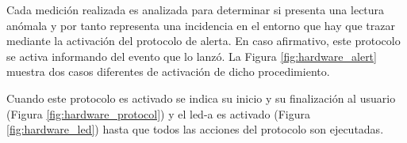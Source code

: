 \documentclass[12pt,a4paper, twoside]{report}
\begin{document}
	Cada medición realizada es analizada para determinar si presenta una lectura anómala y por tanto representa una incidencia en el entorno que hay que trazar mediante la activación del protocolo de alerta. En caso afirmativo, este protocolo se activa informando del evento que lo lanzó. La Figura \ref{fig:hardware_alert} muestra dos casos diferentes de activación de dicho procedimiento.
	
	
	Cuando este protocolo es activado se indica su inicio y su finalización al usuario (Figura \ref{fig:hardware_protocol}) y el \gls{led-a} es activado (Figura \ref{fig:hardware_led}) hasta que todos las acciones del protocolo son ejecutadas.
	
%		
	
\end{document}
